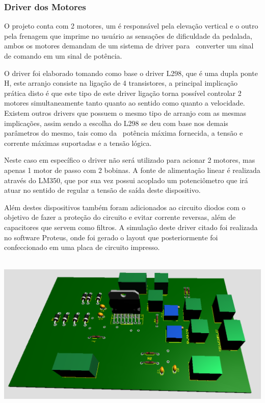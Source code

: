     \subsubsection{Driver dos Motores}

    O projeto conta com 2 motores, um é responsável pela elevação vertical e o outro pela frenagem que imprime no usuário as sensações de dificuldade da pedalada, ambos os motores demandam de um sistema de driver para  converter um sinal de comando em um sinal de potência. 

    O driver foi elaborado tomando como base o driver L298, que é uma dupla ponte H, este arranjo consiste na ligação de 4 transistores, a principal implicação prática disto é que este tipo de este driver ligação torna possível controlar 2 motores simultaneamente tanto quanto ao sentido como quanto a velocidade. Existem outros drivers que possuem o mesmo tipo de arranjo com as mesmas implicações, assim sendo a escolha do L298 se deu com base nos demais parâmetros do mesmo, tais como da  potência máxima fornecida, a tensão e corrente máximas suportadas e a tensão lógica. 

    Neste caso em específico o driver não será utilizado para acionar 2 motores, mas apenas 1 motor de passo com 2 bobinas. A fonte de alimentação linear é realizada através do LM350, que por sua vez possui acoplado um potenciômetro que irá atuar no sentido de regular a tensão de saída deste dispositivo. 
    
    Além destes dispositivos também foram adicionados ao circuito diodos com o objetivo de fazer a proteção do circuito e evitar corrente reversas, além de capacitores que servem como filtros. A simulação deste driver citado foi realizada no software Proteus, onde foi gerado o layout que posteriormente foi confeccionado em uma placa de circuito impresso. 

        \begin{center}
            \includegraphics[scale=0.5]{figuras/driver3d}
               \label{driver3d}
          \end{center}  
